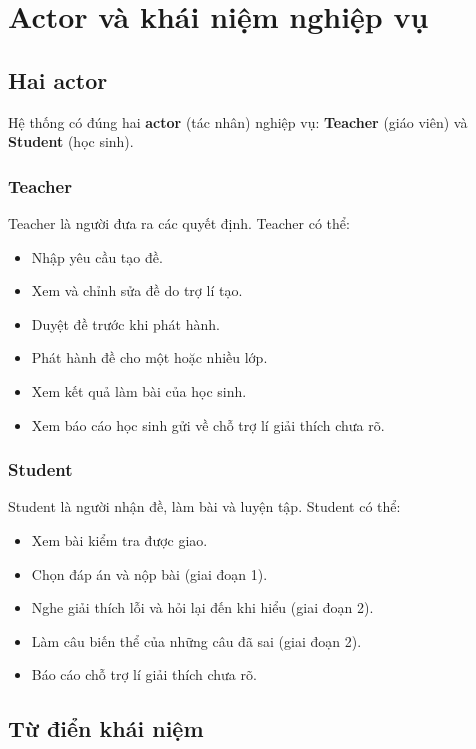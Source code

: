 \chapter{Actor và khái niệm nghiệp vụ}
\label{ch:actor-va-khai-niem}

\section{Hai actor}

Hệ thống có đúng hai \textbf{actor} (tác nhân) nghiệp vụ: \textbf{Teacher} (giáo viên) và
\textbf{Student} (học sinh).

\subsection{Teacher}

Teacher là người đưa ra các quyết định. Teacher có thể:

\begin{itemize}
  \item Nhập yêu cầu tạo đề.
  \item Xem và chỉnh sửa đề do trợ lí tạo.
  \item Duyệt đề trước khi phát hành.
  \item Phát hành đề cho một hoặc nhiều lớp.
  \item Xem kết quả làm bài của học sinh.
  \item Xem báo cáo học sinh gửi về chỗ trợ lí giải thích chưa rõ.
\end{itemize}

\subsection{Student}

Student là người nhận đề, làm bài và luyện tập. Student có thể:

\begin{itemize}
  \item Xem bài kiểm tra được giao.
  \item Chọn đáp án và nộp bài (giai đoạn 1).
  \item Nghe giải thích lỗi và hỏi lại đến khi hiểu (giai đoạn 2).
  \item Làm câu biến thể của những câu đã sai (giai đoạn 2).
  \item Báo cáo chỗ trợ lí giải thích chưa rõ.
\end{itemize}

\section{Từ điển khái niệm}
\label{sec:tu-dien}


